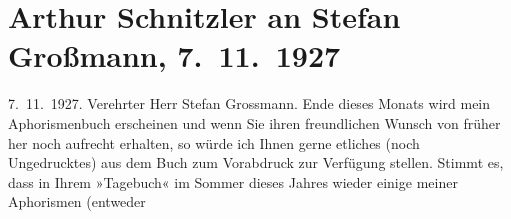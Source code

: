 

         
         \newcommand{\erwaehntePersonen}{Personen: Stefan Großmann}
         \newcommand{\erwaehnteInstitutionen}{Institutionen: Das Tage-Buch}
         \newcommand{\erwaehnteOrte}{Orte: Berlin, Beuthstrasse, Wien}
         \newcommand{\erwaehnteWerke}{Werke: Bemerkungen, Bemerkungen. (Aus dem noch unveröffentlichten »Buch der Sprüche und Bedenken«), Bemerkungen. Aus dem noch unveröffentlichten »Buch der Sprüche und Bedenken«., Buch der Sprüche und Bedenken, Das Tage-Buch, Dresdner Neueste Nachrichten, Neue Freie Presse}
               \section[Arthur Schnitzler an Stefan Großmann, 7. 11. 1927]{ Arthur Schnitzler an Stefan Großmann, 7. 11. 1927}\nopagebreak{}\rehead{ }\begin{ledgroupsized}[t]{13cm}\normalsize\beginnumbering \toendnotes[C]{\smallbreak\pagebreak[2]} 
\toendnotes[C]{\smallbreak}\pstart
           \raggedleft{}{\pb}7. 11. 1927.\pend
           \pstart{}Verehrter Herr Stefan Grossmann.\pend\pstart
           Ende dieses Monats wird mein Aphorismenbuch erscheinen und wenn Sie ihren
                    freundlichen Wunsch von früher her noch aufrecht erhalten, so würde ich Ihnen
                    gerne etliches (noch Ungedrucktes) aus dem Buch zum Vorabdruck zur
                    Verfügung stellen.\pend
           \pstart
           Stimmt es, dass in Ihrem »Tagebuch« im
                        Sommer dieses Jahres wieder einige meiner Aphorismen (entweder

\end{ledgroupsized}
